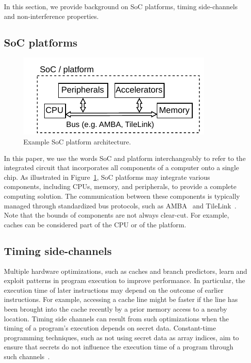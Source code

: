 In this section, we provide background on SoC platforms, timing side-channels and non-interference properties.

\subsection{SoC platforms}

\begin{figure}[t]
    \begin{center}
    \includegraphics[width=0.8\columnwidth]{figures/exampleplatform/exampleplatform.pdf}
    \end{center}
    \vspace*{-1em}
    \caption{\label{fig:exampleplatform}
        Example SoC platform architecture.
    }
    \vspace*{-1em}
\end{figure}

In this paper, we use the words SoC and platform interchangeably to refer to the integrated circuit that incorporates all components of a computer onto a single chip.
As illustrated in Figure~\ref{fig:exampleplatform}, SoC platforms may integrate various components, including CPUs, memory, and peripherals, to provide a complete computing solution.
The communication between these components is typically managed through standardized bus protocols, such as AMBA~\cite{arm_amba} and TileLink~\cite{tilelink_spec}.
Note that the bounds of components are not always clear-cut.
For example, caches can be considered part of the CPU or of the platform.

\subsection{Timing side-channels}

Multiple hardware optimizations, such as caches and branch predictors, learn and exploit patterns in program execution to improve performance.
In particular, the execution time of later instructions may depend on the outcome of earlier instructions.
For example, accessing a cache line might be faster if the line has been brought into the cache recently by a prior memory access to a nearby location.
Timing side channels can result from such optimizations when the timing of a program's execution depends on secret data.
Constant-time programming techniques, such as not using secret data as array indices, aim to ensure that secrets do not influence the execution time of a program through such channels~\cite{OsvikShamirTromer2006CacheAES,AlmeidaEtAl2016CTVerif}.

